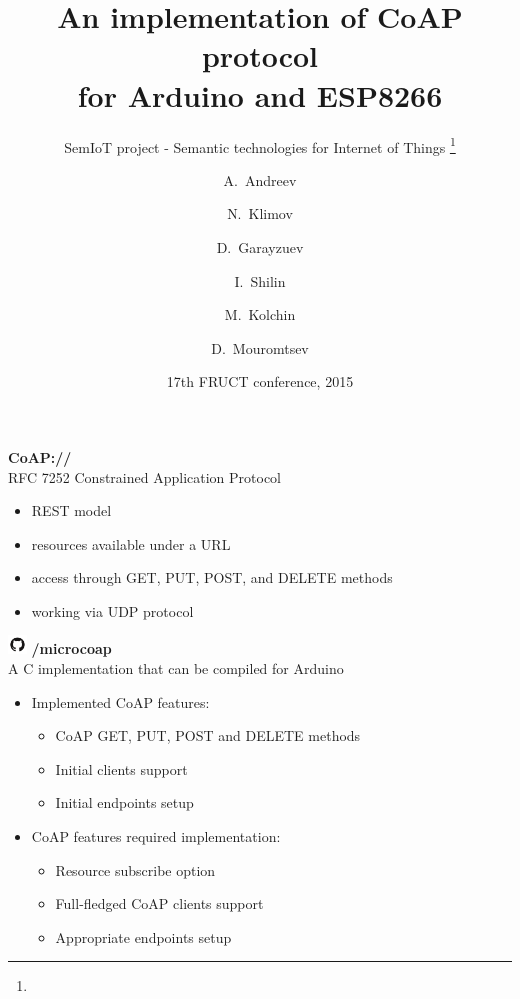 \documentclass{beamer}
\title{An implementation of CoAP protocol\\ for Arduino and ESP8266}
\subtitle{
    SemIoT project - Semantic technologies for Internet of Things
    \footnote{\semioturl}
}
\author{
    A.~Andreev
    \and
    N.~Klimov
    \and
    D.~Garayzuev
    \and
    I.~Shilin
    \and
    M.~Kolchin
    \and
    D.~Mouromtsev
}
\institute[NRU ITMO] %
{
    ITMO University, St.Petersburg, Russia
}
\date{17th FRUCT conference, 2015}
\begin{document}
    \begin{frame}
        \titlepage
    \end{frame}

    \begin{frame}
        \begin{center}
            \begin{multicols}{2}
                \huge{\textbf{CoAP://}}\\
                \large{RFC 7252 Constrained Application Protocol}
            \end{multicols}
        \end{center}
        \begin{itemize}
            \item REST model
            \item resources available under a URL
            \item access through GET, PUT, POST, and DELETE methods
            \item working via UDP protocol
        \end{itemize}
    \end{frame}

    \begin{frame}
        \begin{multicols}{2}
            \includegraphics[height=0.5cm,keepaspectratio]{github}
            \huge{\textbf{/microcoap}}\\
            \large{A C implementation that can be compiled for Arduino}
        \end{multicols}
        \begin{itemize}
            \item Implemented CoAP features:
                \begin{itemize}
                    \item CoAP GET, PUT, POST and DELETE methods
                    \item Initial clients support
                    \item Initial endpoints setup
                \end{itemize}
            \item CoAP features required implementation:
                \begin{itemize}
                    \item Resource subscribe option
                    \item Full-fledged CoAP clients support
                    \item Appropriate endpoints setup
                \end{itemize}
        \end{itemize}
    \end{frame}
    
\end{document}
